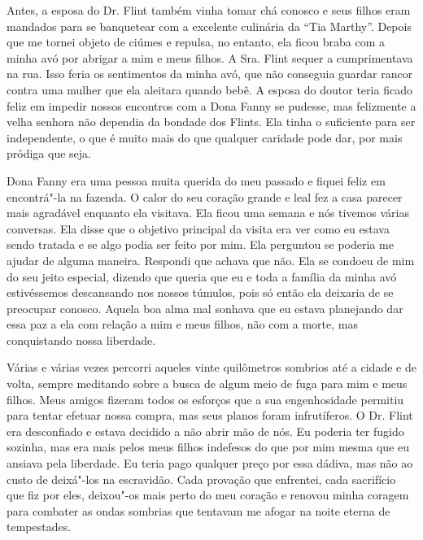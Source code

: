 Antes, a esposa do Dr. Flint também
vinha tomar chá conosco e seus filhos eram mandados para se banquetear
com a excelente culinária da ``Tia Marthy''. Depois que me tornei objeto
de ciúmes e repulsa, no entanto, ela ficou braba com a minha avó por
abrigar a mim e meus filhos. A Sra. Flint sequer a cumprimentava na rua.
Isso feria os sentimentos da minha avó, que não conseguia guardar rancor
contra uma mulher que ela aleitara quando bebê. A esposa do doutor teria
ficado feliz em impedir nossos encontros com a Dona Fanny se pudesse,
mas felizmente a velha senhora não dependia da bondade dos Flints. Ela
tinha o suficiente para ser independente, o que é muito mais do que
qualquer caridade pode dar, por mais pródiga que seja.

Dona Fanny era uma pessoa muita querida
do meu passado e fiquei feliz em encontrá"-la na fazenda. O calor do seu
coração grande e leal fez a casa parecer mais agradável enquanto ela
visitava. Ela ficou uma semana e nós tivemos várias conversas. Ela disse
que o objetivo principal da visita era ver como eu estava sendo tratada
e se algo podia ser feito por mim. Ela perguntou se poderia me ajudar de
alguma maneira. Respondi que achava que não. Ela se condoeu de mim do
seu jeito especial, dizendo que queria que eu e toda a família da minha
avó estivéssemos descansando nos nossos túmulos, pois só então ela
deixaria de se preocupar conosco. Aquela boa alma mal sonhava que eu
estava planejando dar essa paz a ela com relação a mim e meus filhos,
não com a morte, mas conquistando nossa liberdade.

Várias e várias vezes percorri aqueles
vinte quilômetros sombrios até a cidade e de volta, sempre meditando
sobre a busca de algum meio de fuga para mim e meus filhos. Meus amigos
fizeram todos os esforços que a sua engenhosidade permitiu para tentar
efetuar nossa compra, mas seus planos foram infrutíferos. O Dr. Flint
era desconfiado e estava decidido a não abrir mão de nós. Eu poderia ter
fugido sozinha, mas era mais pelos meus filhos indefesos do que por mim
mesma que eu ansiava pela liberdade. Eu teria pago qualquer preço por
essa dádiva, mas não ao custo de deixá"-los na escravidão. Cada provação
que enfrentei, cada sacrifício que fiz por eles, deixou"-os mais perto do
meu coração e renovou minha coragem para combater as ondas sombrias que
tentavam me afogar na noite eterna de tempestades.

